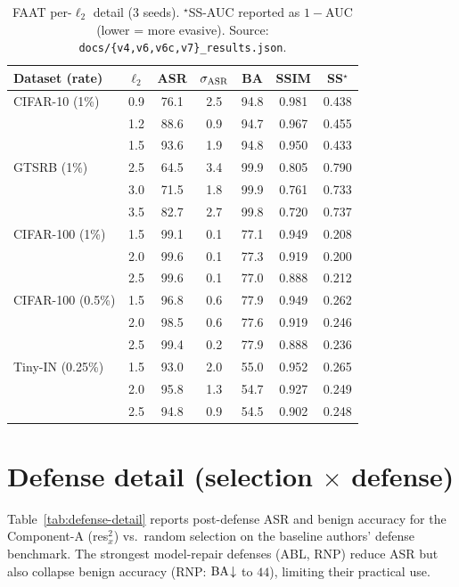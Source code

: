 \documentclass[10pt,twocolumn,letterpaper]{article}
\begin{document}
\begin{table}[h]
\centering
\small
\setlength{\tabcolsep}{3.5pt}
\begin{tabular}{l c c c c c c}
\toprule
Dataset (rate) & $\ell_2$ & ASR & $\sigma_{\mathrm{ASR}}$ & BA & SSIM & SS$^\star$ \\
\midrule
CIFAR-10 (1\%)   & 0.9 & 76.1 & 2.5 & 94.8 & 0.981 & 0.438 \\
                 & 1.2 & 88.6 & 0.9 & 94.7 & 0.967 & 0.455 \\
                 & 1.5 & 93.6 & 1.9 & 94.8 & 0.950 & 0.433 \\
\midrule
GTSRB (1\%)      & 2.5 & 64.5 & 3.4 & 99.9 & 0.805 & 0.790 \\
                 & 3.0 & 71.5 & 1.8 & 99.9 & 0.761 & 0.733 \\
                 & 3.5 & 82.7 & 2.7 & 99.8 & 0.720 & 0.737 \\
\midrule
CIFAR-100 (1\%)  & 1.5 & 99.1 & 0.1 & 77.1 & 0.949 & 0.208 \\
                 & 2.0 & 99.6 & 0.1 & 77.3 & 0.919 & 0.200 \\
                 & 2.5 & 99.6 & 0.1 & 77.0 & 0.888 & 0.212 \\
\midrule
CIFAR-100 (0.5\%)& 1.5 & 96.8 & 0.6 & 77.9 & 0.949 & 0.262 \\
                 & 2.0 & 98.5 & 0.6 & 77.6 & 0.919 & 0.246 \\
                 & 2.5 & 99.4 & 0.2 & 77.9 & 0.888 & 0.236 \\
\midrule
Tiny-IN (0.25\%) & 1.5 & 93.0 & 2.0 & 55.0 & 0.952 & 0.265 \\
                 & 2.0 & 95.8 & 1.3 & 54.7 & 0.927 & 0.249 \\
                 & 2.5 & 94.8 & 0.9 & 54.5 & 0.902 & 0.248 \\
\bottomrule
\end{tabular}
\caption{FAAT per-$\ell_2$ detail (3 seeds). $^\star$SS-AUC reported as
$1{-}$AUC (lower = more evasive). Source: \texttt{docs/\{v4,v6,v6c,v7\}\_results.json}.}
\label{tab:faat-detail}
\end{table}

\section{Defense detail (selection $\times$ defense)}
\label{sec:defense-detail}
Table~\ref{tab:defense-detail} reports post-defense ASR and benign accuracy for
the Component-A (res$_x^2$) vs.\ random selection on the baseline authors'
defense benchmark. The strongest model-repair defenses (ABL, RNP) reduce ASR but
also collapse benign accuracy (RNP: $\mathrm{BA}\!\downarrow$ to $44$), limiting their
practical use.
\end{document}
